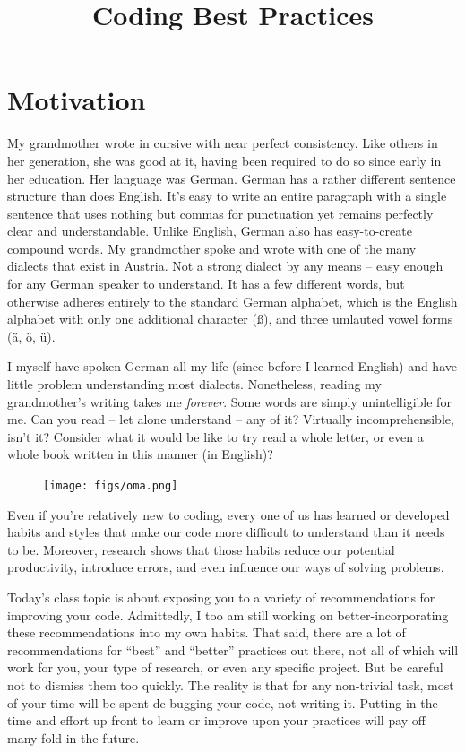 \documentclass[12pt,letterpaper]{article}
\author{}
\date{}
\title{Coding Best Practices}
\begin{document}
\maketitle


\tableofcontents

\pagebreak

\section{Motivation}

My grandmother wrote in cursive with near perfect consistency.
Like others in her generation, she was good at it, having been required to do so since early in her 
education.
Her language was German.
German has a rather different sentence structure than does English.
It's easy to write an entire paragraph with a single sentence that uses nothing but commas for 
punctuation yet remains perfectly clear and understandable.
Unlike English, German also has easy-to-create compound words.
My grandmother spoke and wrote with one of the many dialects that exist in Austria.
Not a strong dialect by any means -- easy enough for any German speaker to understand.
It has a few different words, but otherwise adheres entirely to the standard German alphabet, which 
is the English alphabet with only one additional character ({\ss}), and three umlauted vowel forms 
(\"{a}, \"{o}, \"{u}).

I myself have spoken German all my life (since before I learned English) and have little problem 
understanding most dialects.
Nonetheless, reading my grandmother's writing takes me \emph{forever}.
Some words are simply unintelligible for me.
Can you read -- let alone understand -- any of it?
Virtually incomprehensible, isn't it?
Consider what it would be like to try read a whole letter, or even a whole book written in this manner 
(in English)?

\begin{figure}[H]
	\centering
	\texttt{[image: figs/oma.png]}
\end{figure}

Even if you're relatively new to coding, every one of us has learned or developed habits and styles 
that make our code more difficult to understand than it needs to be.
Moreover, research shows that those habits reduce our potential productivity, introduce errors, and 
even influence our ways of solving problems.

Today's class topic is about exposing you to a variety of recommendations for improving your code.
Admittedly, I too am still working on better-incorporating these recommendations into my own 
habits.
That said, there are a lot of recommendations for ``best'' and ``better'' practices out there, not all 
of which will work for you, your type of research, or even any specific project.
But be careful not to dismiss them too quickly.
The reality is that for any non-trivial task, most of your time will be spent de-bugging your code, not 
writing it.
Putting in the time and effort up front to learn or improve upon your practices will pay off many-fold 
in the future.
\end{document}
